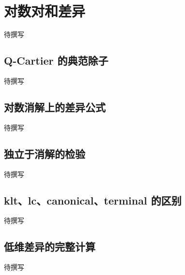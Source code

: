 
% 
% 

\section{对数对和差异}
\label{g5:sec:2903}

待撰写

\subsection{Q-Cartier 的典范除子}
\label{g5:subsec:2903:01}
待撰写

\subsection{对数消解上的差异公式}
\label{g5:subsec:2903:02}
待撰写

\subsection{独立于消解的检验}
\label{g5:subsec:2903:03}
待撰写

\subsection{klt、lc、canonical、terminal 的区别}
\label{g5:subsec:2903:04}
待撰写

\subsection{低维差异的完整计算}
\label{g5:subsec:2903:05}
待撰写
